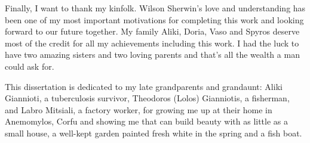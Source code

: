 Finally, I want to thank my kinfolk. Wilson Sherwin's love and understanding has been one of my
most important motivations for completing this work and looking forward to our future together.
My family Aliki, Doria, Vaso and Spyros deserve most of the credit for all my achievements including
this work. I had the luck to have two amazing sisters and two loving parents and that's all the wealth 
a man could ask for. 

This dissertation is dedicated to my late grandparents and grandaunt: 
Aliki Giannioti, a tuberculosis survivor, Theodoros (Lolos) Gianniotis, a fisherman, and
Labro Mitsiali, a factory  worker, for growing me up at their home in Anemomylos, Corfu and showing me that can build beauty with as little as
a small house, a well-kept garden painted fresh white in the spring and a fish boat.


